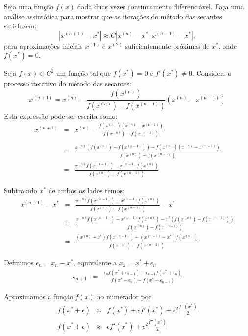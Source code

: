 \begin{exer}
  Seja uma função $f(x)$ dada duas vezes continuamente diferenciável. Faça uma análise assintótica para mostrar que as iterações do método das secantes satisfazem:
  \begin{equation}
    |x^{(n+1)} - x^*| \approx C |x^{(n)} - x^*||x^{(n-1)} - x^*|,
  \end{equation}
para aproximações iniciais $x^{(1)}$ e $x^{(2)}$ suficientemente próximas de $x^*$, onde $f(x^*) = 0$.
\end{exer}
\begin{resp}
Seja $f(x)\in C^2$ um função tal que $f(x^*)=0$ e $f'(x^*)\neq 0$. Considere o processo iterativo do método das secantes:
\begin{equation} x^{(n+1)}=x^{(n)}- \frac{f(x^{(n)})}{f(x^{(n)})-f(x^{(n-1)})}(x^{(n)}-x^{(n-1)}) \end{equation}
Esta expressão pode ser escrita como:
\begin{eqnarray}
x^{(n+1)}&=&x^{(n)}- \frac{f(x^{(n)})(x^{(n)}-x^{(n-1)})}{f(x^{(n)})-f(x^{(n-1)})}\\~\\
 &=&\frac{x^{(n)}\left(f(x^{(n)})-f(x^{(n-1)})\right)-f(x^{(n)})(x^{(n)}-x^{(n-1)})}{f(x^{(n)})-f(x^{(n-1)})}\\
 &=&\frac{x^{(n)} f(x^{(n-1)})-x^{(n-1)}f(x^{(n)})}{f(x^{(n)})-f(x^{(n-1)})}
\end{eqnarray}

Subtraindo $x^*$ de ambos os lados temos:
\begin{eqnarray}
x^{(n+1)}-x^*
 &=&\frac{x^{(n)} f(x^{(n-1)})-x^{(n-1)}f(x^{(n)})}{f(x^{(n)})-f(x^{(n-1)})}-x^*\\
 &=&\frac{x^{(n)} f(x^{(n-1)})-x^{(n-1)}f(x^{(n)})-x^*\left(f(x^{(n)})-f(x^{(n-1)})\right)}{f(x^{(n)})-f(x^{(n-1)})}\\
 &=&\frac{(x^{(n)}-x^*) f(x^{(n-1)})-(x^{(n-1)}-x^*)f(x^{(n)})}{f(x^{(n)})-f(x^{(n-1)})}
\end{eqnarray}

Definimos $\epsilon_n=x_n-x^*$, equivalente a $x_n=x^*+\epsilon_n$
\begin{eqnarray}
\epsilon_{n+1}
 &=&\frac{\epsilon_n f(x^*+\epsilon_{n-1})-\epsilon_{n-1}f(x^*+\epsilon_n)}{f(x^*+\epsilon_n)-f(x^*+\epsilon_{n-1})}
\end{eqnarray}

Aproximamos a função $f(x)$ no numerador por
\begin{eqnarray}
f(x^*+\epsilon)&\approx& f(x^*)+\epsilon f'(x^*) + \epsilon^2 \frac{f''(x^*)}{2}\\
f(x^*+\epsilon)&\approx& \epsilon f'(x^*) + \epsilon^2 \frac{f''(x^*)}{2}
\end{eqnarray}


\end{resp}

